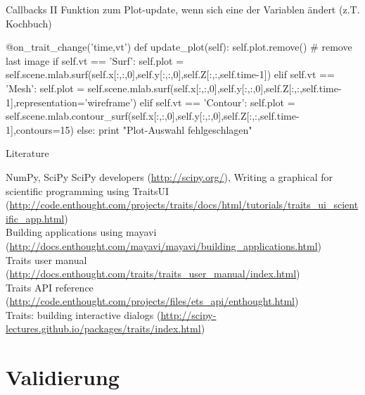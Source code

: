 \documentclass[hyperref={xetex}]{beamer}
\begin{document}
\begin{frame}[fragile]{Callbacks II}
Funktion zum Plot-update, wenn sich eine der Variablen ändert (z.T. Kochbuch)
\begin{pyin}
    @on_trait_change('time,vt')
    def update_plot(self):
        self.plot.remove() # remove last image
        if self.vt == 'Surf':
            self.plot = self.scene.mlab.surf(self.x[:,:,0],self.y[:,:,0],self.Z[:,:,self.time-1])
        elif self.vt == 'Mesh':
            self.plot = self.scene.mlab.surf(self.x[:,:,0],self.y[:,:,0],self.Z[:,:,self.time-1],representation='wireframe')
        elif self.vt == 'Contour':
            self.plot = self.scene.mlab.contour_surf(self.x[:,:,0],self.y[:,:,0],self.Z[:,:,self.time-1],contours=15)
        else:
            print "Plot-Auswahl fehlgeschlagen"  
\end{pyin}
\end{frame}

\begin{frame}[fragile]{Literature}
 \begin{thebibliography}{10}
      \small
     \alert{NumPy, SciPy} SciPy developers (\url{http://scipy.org/}),
     Writing a graphical for scientific programming using TraitsUI (\url{http://code.enthought.com/projects/traits/docs/html/tutorials/traits_ui_scientific_app.html})\\
     Building applications using mayavi (\url{http://docs.enthought.com/mayavi/mayavi/building_applications.html})\\
     Traits user manual (\url{http://docs.enthought.com/traits/traits_user_manual/index.html})\\
     Traits API reference  (\url{http://code.enthought.com/projects/files/ets_api/enthought.html})\\
     Traits: building interactive dialogs (\url{http://scipy-lectures.github.io/packages/traits/index.html})
  \end{thebibliography}
  

\end{frame}


\section{Validierung}
\end{document}
